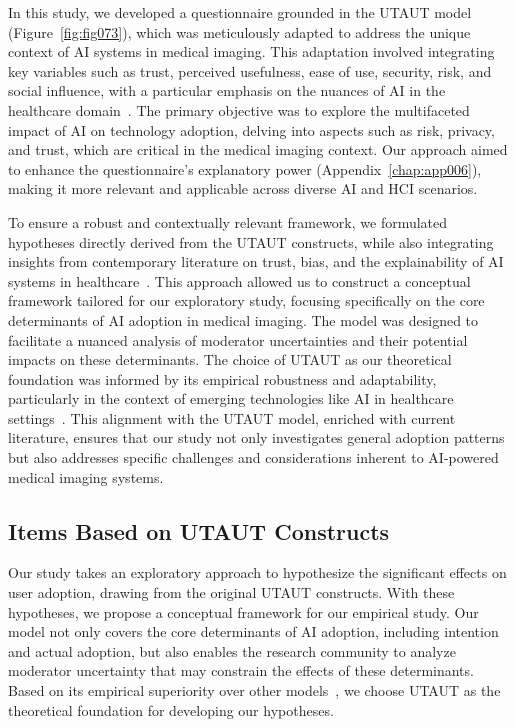 \textcolor{revised}{In this study, we developed a questionnaire grounded in the \ac{UTAUT} model (Figure~\ref{fig:fig073}), which was meticulously adapted to address the unique context of \ac{AI} systems in medical imaging.
This adaptation involved integrating key variables such as trust, perceived usefulness, ease of use, security, risk, and social influence, with a particular emphasis on the nuances of \ac{AI} in the healthcare domain~\cite{BOOTSMAN201999}.
The primary objective was to explore the multifaceted impact of \ac{AI} on technology adoption, delving into aspects such as risk, privacy, and trust, which are critical in the medical imaging context.
Our approach aimed to enhance the questionnaire's explanatory power (Appendix~\ref{chap:app006}), making it more relevant and applicable across diverse \ac{AI} and \ac{HCI} scenarios.}

\textcolor{revised}{To ensure a robust and contextually relevant framework, we formulated hypotheses directly derived from the \ac{UTAUT} constructs, while also integrating insights from contemporary literature on trust, bias, and the explainability of \ac{AI} systems in healthcare~\cite{CHOUDHURY2022103708}.
This approach allowed us to construct a conceptual framework tailored for our exploratory study, focusing specifically on the core determinants of \ac{AI} adoption in medical imaging.
The model was designed to facilitate a nuanced analysis of moderator uncertainties and their potential impacts on these determinants.
The choice of \ac{UTAUT} as our theoretical foundation was informed by its empirical robustness and adaptability, particularly in the context of emerging technologies like \ac{AI} in healthcare settings~\cite{CALISTO2022102922}.
This alignment with the \ac{UTAUT} model, enriched with current literature, ensures that our study not only investigates general adoption patterns but also addresses specific challenges and considerations inherent to \ac{AI}-powered medical imaging systems.}

\subsection{Items Based on UTAUT Constructs}
\label{sec:chap004003001}

Our study takes an exploratory approach to hypothesize the significant effects on user adoption, drawing from the original \ac{UTAUT} constructs.
With these hypotheses, we propose a conceptual framework for our empirical study.
Our model not only covers the core determinants of \ac{AI} adoption, including intention and actual adoption, but also enables the research community to analyze moderator uncertainty that may constrain the effects of these determinants.
Based on its empirical superiority over other models~\cite{CALISTO2022102922}, we choose \ac{UTAUT} as the theoretical foundation for developing our hypotheses.

